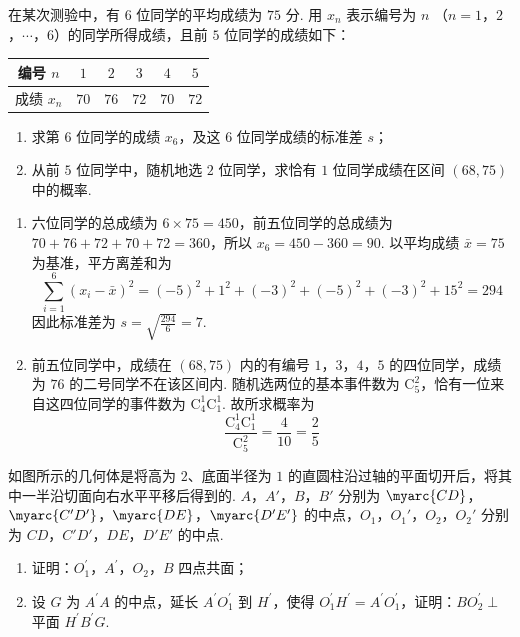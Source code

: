 \begin{problem}
在某次测验中，有 \(6\) 位同学的平均成绩为 \(75\) 分. 用 \( x_{n} \) 表示编号为 \(n\) （\(n = 1\)，\(2\)，\(\cdots\)，\(6\)）的同学所得成绩，且前 \(5\) 位同学的成绩如下：

\begin{center}
\begin{tabular}{c|ccccc}
编号 \(n\) & \(1\) & \(2\) & \(3\) & \(4\) & \(5\) \\
\hline
成绩 \(x_{n}\) & \(70\) & \(76\) & \(72\) & \(70\) & \(72\)
\end{tabular}
\end{center}

\begin{enumerate}
\item 求第 \(6\) 位同学的成绩 \(x_6\)，及这 \(6\) 位同学成绩的标准差 \(s\)；
\item 从前 \(5\) 位同学中，随机地选 \(2\) 位同学，求恰有 \(1\) 位同学成绩在区间 \((68, 75)\) 中的概率.
\end{enumerate}
\end{problem}

\begin{solution}
\begin{enumerate}
\item 六位同学的总成绩为 \(6\times75=450\)，前五位同学的总成绩为 \(70+76+72+70+72=360\)，所以 \(x_6=450-360=90\). 以平均成绩 \(\bar x=75\) 为基准，平方离差和为
\[
\sum_{i=1}^{6}(x_i-\bar x)^2=(-5)^2+1^2+(-3)^2+(-5)^2+(-3)^2+15^2=294
\]
因此标准差为 \(s=\sqrt{\frac{294}{6}}=7\).
\item 前五位同学中，成绩在 \((68,75)\) 内的有编号 \(1\)，\(3\)，\(4\)，\(5\) 的四位同学，成绩为 \(76\) 的二号同学不在该区间内. 随机选两位的基本事件数为 \(\mathrm C_5^2\)，恰有一位来自这四位同学的事件数为 \(\mathrm C_4^1\mathrm C_1^1\). 故所求概率为
\[
\frac{\mathrm C_4^1\mathrm C_1^1}{\mathrm C_5^2}=\frac4{10}=\frac25
\]
\end{enumerate}
\end{solution}

\begin{problem}
如图所示的几何体是将高为 \(2\)、底面半径为 \(1\) 的直圆柱沿过轴的平面切开后，将其中一半沿切面向右水平平移后得到的. \(A\)，\(A'\)，\(B\)，\(B'\) 分别为 \(\myarc{CD}\)，\(\myarc{C'D'}\)，\(\myarc{DE}\)，\(\myarc{D'E'}\) 的中点，\(O_1\)，\(O_1'\)，\(O_2\)，\(O_2'\) 分别为 \(CD\)，\(C'D'\)，\(DE\)，\(D'E'\) 的中点.

\begin{enumerate}
\item 证明：\(O_{1}^{\prime}\)，\(A^{\prime}\)，\(O_{2}\)，\(B\) 四点共面；
\item 设 \(G\) 为 \(A^{\prime}A\) 的中点，延长 \(A^{\prime}O_{1}^{\prime}\) 到 \(H^{\prime}\)，使得 \(O_{1}^{\prime}H^{\prime}=A^{\prime}O_{1}^{\prime}\)，证明：\(BO_{2}^{\prime}\perp\) 平面 \(H^{\prime}B^{\prime}G\).
\end{enumerate}

\end{problem}

